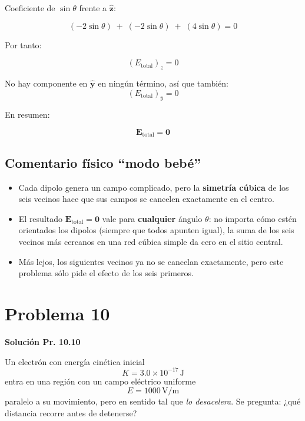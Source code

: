 \documentclass{article}
\begin{document}
Coeficiente de $\sin\theta$ frente a $\hat{\mathbf{z}}$:

\[
(-2\sin\theta) \;+\; (-2\sin\theta) \;+\; (4\sin\theta) = 0
\]

Por tanto:

\[
(E_{\text{total}})_{z} = 0
\]

No hay componente en $\hat{\mathbf{y}}$ en ningún término, así que también:
\[
(E_{\text{total}})_{y} = 0
\]

En resumen:

\begin{equation}
\boxed{
\mathbf{E}_{\text{total}} = \mathbf{0}
}
\label{eq:Etotal-cero}
\end{equation}

\subsection*{Comentario físico “modo bebé”}

\begin{itemize}
  \item Cada dipolo genera un campo complicado, pero la \textbf{simetría cúbica} de los seis vecinos hace que sus campos se cancelen exactamente en el centro.
  \item El resultado $\mathbf{E}_{\text{total}} = \mathbf{0}$ vale para \textbf{cualquier} ángulo $\theta$: no importa cómo estén orientados los dipolos (siempre que todos apunten igual), la suma de los seis vecinos más cercanos en una red cúbica simple da cero en el sitio central.
  \item Más lejos, los siguientes vecinos ya no se cancelan exactamente, pero este problema sólo pide el efecto de los seis primeros.
\end{itemize}


\section{Problema 10}

\textcolor{Cinnabar}{\textbf{Solución Pr. 10.10}} \vspace{0.4cm}

Un electrón con energía cinética inicial
\begin{equation}
K = 3.0\times 10^{-17}\,\text{J}
\label{eq:K-inicial}
\end{equation}
entra en una región con un campo eléctrico uniforme
\begin{equation}
E = 1000\,\text{V/m}
\label{eq:E-valor}
\end{equation}
paralelo a su movimiento, pero en sentido tal que \emph{lo desacelera}. Se pregunta: ¿qué distancia recorre antes de detenerse?
\end{document}
